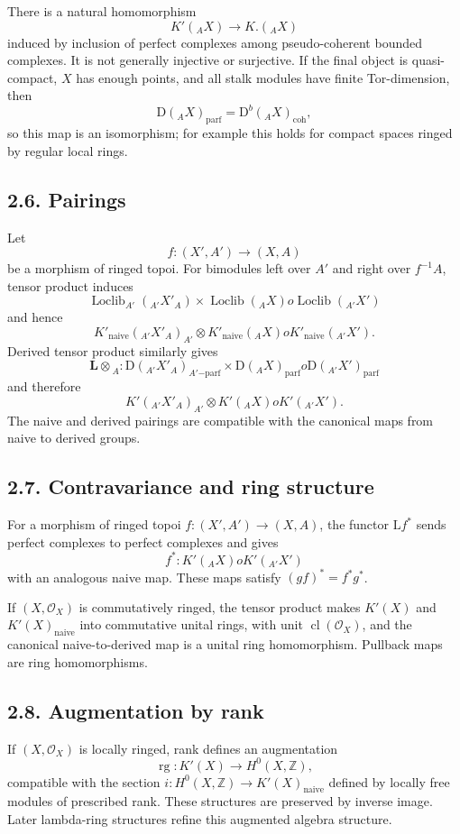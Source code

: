 \documentclass[13pt]{extarticle}
\newcommand{\ZZ}{\mathbb Z}
\newcommand{\cO}{\mathcal O}
\newcommand{\D}{\mathrm D}
\newcommand{\Loclib}{\operatorname{Loclib}}
\newcommand{\cl}{\operatorname{cl}}
\newcommand{\rg}{\operatorname{rg}}
\newcommand{\Ltens}{\mathbin{\mathbf L\!\otimes}}
\begin{document}
There is a natural homomorphism
\[
K'({}_AX)\longrightarrow K.({}_AX)
\]
induced by inclusion of perfect complexes among pseudo-coherent bounded complexes. It is not generally injective or surjective. If the final object is quasi-compact, $X$ has enough points, and all stalk modules have finite Tor-dimension, then
\[
\D({}_AX)_{\mathrm{parf}}=\D^b({}_AX)_{\mathrm{coh}},
\]
so this map is an isomorphism; for example this holds for compact spaces ringed by regular local rings.

\subsection*{2.6. Pairings}
Let
\[
f:(X',A')\longrightarrow (X,A)
\]
be a morphism of ringed topoi. For bimodules left over $A'$ and right over $f^{-1}A$, tensor product induces
\[
\Loclib_{A'}({}_{A'}X'_A)\times\Loclib({}_AX)	o\Loclib({}_{A'}X')
\]
and hence
\[
K'_{\mathrm{naive}}({}_{A'}X'_A)_{A'}\otimes K'_{\mathrm{naive}}({}_AX)	o K'_{\mathrm{naive}}({}_{A'}X').
\]
Derived tensor product similarly gives
\[
\Ltens_A:
\D({}_{A'}X'_A)_{A'\mathrm{-parf}}\times \D({}_AX)_{\mathrm{parf}}	o\D({}_{A'}X')_{\mathrm{parf}}
\]
and therefore
\[
K'({}_{A'}X'_A)_{A'}\otimes K'({}_AX)	o K'({}_{A'}X').
\]
The naive and derived pairings are compatible with the canonical maps from naive to derived groups.

\subsection*{2.7. Contravariance and ring structure}
For a morphism of ringed topoi $f:(X',A')\to(X,A)$, the functor $\mathrm Lf^*$ sends perfect complexes to perfect complexes and gives
\[
f^*:K'({}_AX)	o K'({}_{A'}X')
\]
with an analogous naive map. These maps satisfy $(gf)^*=f^*g^*$.

If $(X,\cO_X)$ is commutatively ringed, the tensor product makes $K'(X)$ and $K'(X)_{\mathrm{naive}}$ into commutative unital rings, with unit $\cl(\cO_X)$, and the canonical naive-to-derived map is a unital ring homomorphism. Pullback maps are ring homomorphisms.

\subsection*{2.8. Augmentation by rank}
If $(X,\cO_X)$ is locally ringed, rank defines an augmentation
\[
\rg:K'(X)\to H^0(X,\ZZ),
\]
compatible with the section $i:H^0(X,\ZZ)\to K'(X)_{\mathrm{naive}}$ defined by locally free modules of prescribed rank. These structures are preserved by inverse image. Later lambda-ring structures refine this augmented algebra structure.
\end{document}

